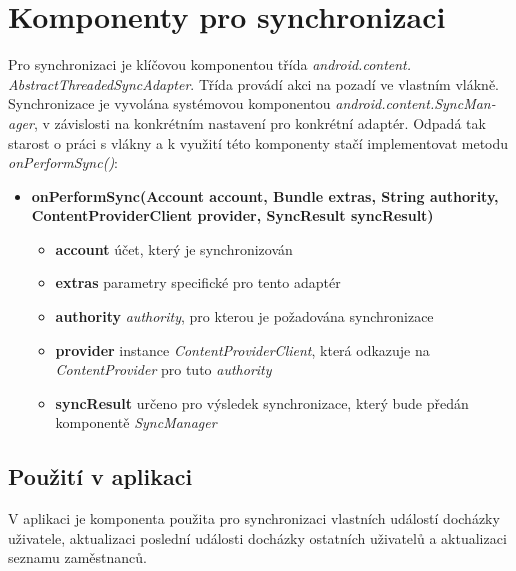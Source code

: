 \documentclass{diplomka}
\begin{document}
\section{Komponenty pro synchronizaci}
Pro synchronizaci je klíčovou komponentou třída \emph{android.content.\\AbstractThreadedSyncAdapter}. Třída provádí akci na pozadí ve vlastním vlákně. Synchronizace je vyvolána systémovou komponentou \emph{android.content.SyncMan-ager}, v závislosti na konkrétním nastavení pro konkrétní adaptér. Odpadá tak starost o práci s vlákny a k využití této komponenty stačí implementovat metodu \emph{onPerformSync()}:
\begin{itemize}[]
\item \textbf{onPerformSync(Account account, Bundle extras, String authority, ContentProviderClient provider, SyncResult syncResult)}\\
\begin{itemize}[]
\item  \textbf{account} účet, který je synchronizován
\item  \textbf{extras} parametry specifické pro tento adaptér
\item  \textbf{authority} \emph{authority}, pro kterou je požadována synchronizace
\item  \textbf{provider} instance \emph{ContentProviderClient}, která odkazuje na \emph{ContentProvider} pro tuto \emph{authority}
\item  \textbf{syncResult} určeno pro výsledek synchronizace, který bude předán komponentě \emph{SyncManager}
\end{itemize}
\end{itemize}

\subsection*{Použití v aplikaci}
V aplikaci je komponenta použita pro synchronizaci vlastních událostí docházky uživatele, aktualizaci poslední události docházky ostatních uživatelů a aktualizaci seznamu zaměstnanců.
\end{document}
